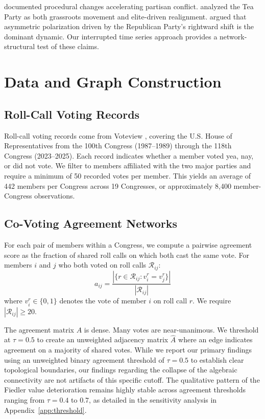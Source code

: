 \documentclass[12pt, a4paper]{article}
\begin{document}
\citet{theriault2008} documented procedural changes accelerating partisan conflict. \citet{skocpol2012} analyzed the Tea Party as both grassroots movement and elite-driven realignment. \citet{mann2012} argued that asymmetric polarization driven by the Republican Party's rightward shift is the dominant dynamic. Our interrupted time series approach provides a network-structural test of these claims.

\section{Data and Graph Construction}

\subsection{Roll-Call Voting Records}

Roll-call voting records come from Voteview \citep{lewis2023}, covering the U.S. House of Representatives from the 100th Congress (1987--1989) through the 118th Congress (2023--2025). Each record indicates whether a member voted yea, nay, or did not vote. We filter to members affiliated with the two major parties and require a minimum of 50 recorded votes per member. This yields an average of 442 members per Congress across 19 Congresses, or approximately 8,400 member-Congress observations.

\subsection{Co-Voting Agreement Networks}

For each pair of members within a Congress, we compute a pairwise agreement score as the fraction of shared roll calls on which both cast the same vote. For members $i$ and $j$ who both voted on roll calls $\mathcal{R}_{ij}$:
\begin{equation}
    a_{ij} = \frac{|\{r \in \mathcal{R}_{ij} : v_i^r = v_j^r\}|}{|\mathcal{R}_{ij}|}
\end{equation}
where $v_i^r \in \{0, 1\}$ denotes the vote of member $i$ on roll call $r$. We require $|\mathcal{R}_{ij}| \geq 20$.

The agreement matrix $A$ is dense. Many votes are near-unanimous. We threshold at $\tau = 0.5$ to create an unweighted adjacency matrix $\hat{A}$ where an edge indicates agreement on a majority of shared votes. While we report our primary findings using an unweighted binary agreement threshold of $\tau = 0.5$ to establish clear topological boundaries, our findings regarding the collapse of the algebraic connectivity are not artifacts of this specific cutoff. The qualitative pattern of the Fiedler value deterioration remains highly stable across agreement thresholds ranging from $\tau = 0.4$ to $0.7$, as detailed in the sensitivity analysis in Appendix~\ref{app:threshold}.
\end{document}
